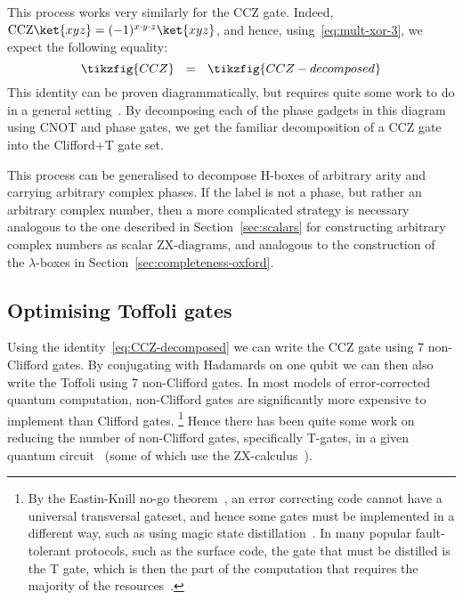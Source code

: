 \documentclass[a4paper,onecolumn,superscriptaddress,11pt,%
				unpublished,%
				allowfontchageintitle,%
				]{quantumarticle}
\begin{document}
This process works very similarly for the CCZ gate. Indeed, $\text{CCZ}\ket{xyz} = (-1)^{x\cdot y\cdot z} \ket{xyz}$, and hence, using~\eqref{eq:mult-xor-3}, we expect the following equality:
\begin{equation}\label{eq:CCZ-decomposed}
	\tikzfig{CCZ} \ \ = \ \ \tikzfig{CCZ-decomposed}
\end{equation}
This identity can be proven diagrammatically, but requires quite some work to do in a general setting~\cite{GraphicalFourier2019}. By decomposing each of the phase gadgets in this diagram using CNOT and phase gates, we get the familiar decomposition of a CCZ gate into the Clifford+T gate set.

This process can be generalised to decompose H-boxes of arbitrary arity and carrying arbitrary complex phases. If the label is not a phase, but rather an arbitrary complex number, then a more complicated strategy is necessary analogous to the one described in Section~\ref{sec:scalars} for constructing arbitrary complex numbers as scalar ZX-diagrams, and analogous to the construction of the $\lambda$-boxes in Section~\ref{sec:completeness-oxford}.


\subsection{Optimising Toffoli gates}\label{sec:toffoli-optimise}

Using the identity~\eqref{eq:CCZ-decomposed} we can write the CCZ gate using 7 non-Clifford gates. By conjugating with Hadamards on one qubit we can then also write the Toffoli using 7 non-Clifford gates. In most models of error-corrected quantum computation, non-Clifford gates are significantly more expensive to implement than Clifford gates.%
\footnote{By the Eastin-Knill no-go theorem~\cite{eastin2009restrictions}, an error correcting code cannot have a universal transversal gateset, and hence some gates must be implemented in a different way, such as using magic state distillation~\cite{campbell2017roads}. In many popular fault-tolerant protocols, such as the surface code, the gate that must be distilled is the T gate, which is then the part of the computation that requires the majority of the resources~\cite{gorman2017quantum}.}
Hence there has been quite some work on reducing the number of non-Clifford gates, specifically T-gates, in a given quantum circuit~\cite{amy2014polynomial,amy2016t,heyfron2018efficient,zhang2019optimizing,nam2018automated} (some of which use the ZX-calculus~\cite{kissinger2019tcount,deBeaudrap2020Techniques}).
\end{document}
